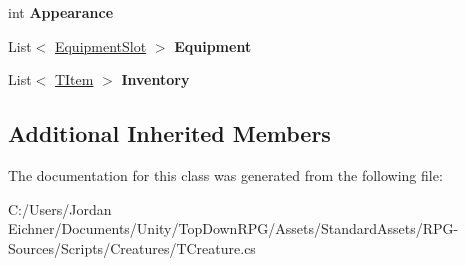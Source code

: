 \begin{DoxyCompactItemize}
\item 
\hypertarget{class_t_creature_ab7b3de27c987823c26de7ddde777965f}{}int {\bfseries Appearance}\label{class_t_creature_ab7b3de27c987823c26de7ddde777965f}

\item 
\hypertarget{class_t_creature_a4ee1294c6f08b7fa6e71ec3bc88694c1}{}List$<$ \hyperlink{struct_t_creature_1_1_equipment_slot}{Equipment\+Slot} $>$ {\bfseries Equipment}\label{class_t_creature_a4ee1294c6f08b7fa6e71ec3bc88694c1}

\item 
\hypertarget{class_t_creature_a7aa47ddea4d58f4e205203861e46617c}{}List$<$ \hyperlink{class_t_item}{T\+Item} $>$ {\bfseries Inventory}\label{class_t_creature_a7aa47ddea4d58f4e205203861e46617c}

\end{DoxyCompactItemize}
\subsection*{Additional Inherited Members}


The documentation for this class was generated from the following file\+:\begin{DoxyCompactItemize}
\item 
C\+:/\+Users/\+Jordan Eichner/\+Documents/\+Unity/\+Top\+Down\+R\+P\+G/\+Assets/\+Standard\+Assets/\+R\+P\+G-\/\+Sources/\+Scripts/\+Creatures/T\+Creature.\+cs\end{DoxyCompactItemize}
